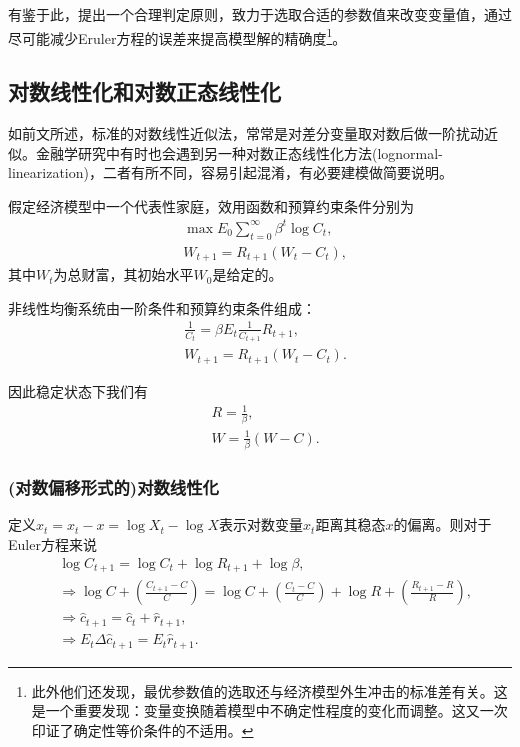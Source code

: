 有鉴于此，\cite{FernandezVillaverde:2006hr}提出一个合理判定原则，致力于选取合适的参数值来改变变量值，通过尽可能减少Eruler方程的误差来提高模型解的精确度\footnote{此外他们还发现，最优参数值的选取还与经济模型外生冲击的标准差有关。这是一个重要发现：变量变换随着模型中不确定性程度的变化而调整。这又一次印证了确定性等价条件的不适用。}。

\subsection{对数线性化和对数正态线性化}
\label{sec:perturbation-log-normal-lin}
如前文所述，标准的对数线性近似法，常常是对差分变量取对数后做一阶扰动近似。金融学研究中有时也会遇到另一种对数正态线性化方法(lognormal-linearization)，二者有所不同，容易引起混淆，有必要建模做简要说明。

假定经济模型中一个代表性家庭，效用函数和预算约束条件分别为
\begin{equation*}
  \begin{split}
    &\max E_0 \sum_{t=0}^{\infty} \beta^t \log C_t, \\
    &W_{t+1} = R_{t+1} (W_t - C_t),
  \end{split}
\end{equation*}
其中$W_t$为总财富，其初始水平$W_0$是给定的。

非线性均衡系统由一阶条件和预算约束条件组成：
\begin{align*}
      &\frac{1}{C_{t}} = \beta E_t \frac{1}{C_{t+1}} R_{t+1},\\
      &W_{t+1} = R_{t+1} \left( W_t - C_t \right).
\end{align*}


因此稳定状态下我们有
\begin{equation*}
  \begin{split}
    &R = \frac{1}{\beta}, \\
    &W = \frac{1}{\beta} (W - C).
  \end{split}
\end{equation*}

\subsubsection{(对数偏移形式的)对数线性化}
定义$\hat{x}_t = x_t - x = \log X_t - \log X$表示对数变量$x_t$距离其稳态$x$的偏离。则对于Euler方程来说
\begin{equation*}
  \begin{split}
    &\log C_{t+1} = \log C_t + \log R_{t+1} + \log \beta, \\
     & \Rightarrow \log C + \left( \frac{C_{t+1} - C}{C} \right) = \log C + \left( \frac{C_{t} - C}{C} \right) + \log R + \left( \frac{R_{t+1} - R}{R} \right), \\
     & \Rightarrow \hat{c}_{t+1} = \hat{c}_{t} + \hat{r}_{t+1}, \\
     & \Rightarrow E_t \Delta \hat{c}_{t+1} = E_t \hat{r}_{t+1}.
  \end{split}
\end{equation*}

